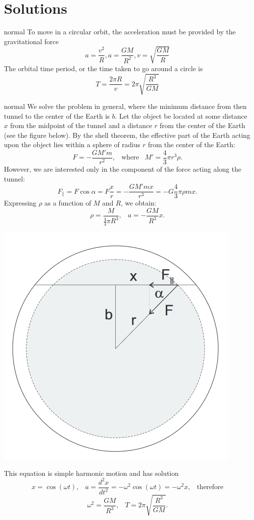\documentclass[11pt]{article}
\begin{document}
\section{Solutions}
\begin{answer}{normal} %
To move in a circular orbit, the acceleration must be provided by the gravitational force $$a = \frac{v^2}{R} , a= \frac{GM}{R^2}, v = \sqrt{\frac{GM}{R}}$$ The orbital time period, or the time taken to go around a circle is $$T = \frac{2\pi R}{v} = 2\pi\sqrt{\frac{R^3}{GM}}$$
\end{answer}

\begin{answer}{normal} %
We solve the problem in general, where the minimum distance from then tunnel to the center of the Earth is $b$. Let the object be located at some distance $x$ from the midpoint of the tunnel and a distance $r$ from the center of the Earth (see the figure below). By the shell theorem, the effective part of the Earth acting upon the object lies within a sphere of radius $r$ from the center of the Earth:
$$F=-\dfrac{GM'm}{r^2},\;\;\;\text{where}\;\;\;M'=\dfrac{4}{3}\pi r^3\rho.$$
However, we are interested only in the component of the force acting along the tunnel:
$$F_\parallel=F\cos\alpha=F\dfrac{x}{r}=-\dfrac{GM'mx}{r^3}=-G\dfrac{4}{3}\pi\rho mx.$$
Expressing $\rho$ as a function of $M$ and $R$, we obtain:
$$\rho=\dfrac{M}{\frac{4}{3}\pi R^3},\;\;\;a=-\dfrac{GM}{R^3}x.$$
\begin{center}
    \includegraphics[width=0.35\linewidth]{Images/CM5.png}
\end{center}
This equation is simple harmonic motion and has solution
$$x=\cos(\omega t),\;\;\;a=\dfrac{d^2x}{dt^2}=-\omega^2\cos(\omega t)=-\omega^2x,\;\;\;\text{therefore}$$
$$\omega^2=\dfrac{GM}{R^3},\;\;\;T=2\pi\sqrt{\dfrac{R^3}{GM}}.$$
\end{answer}
\end{document}
